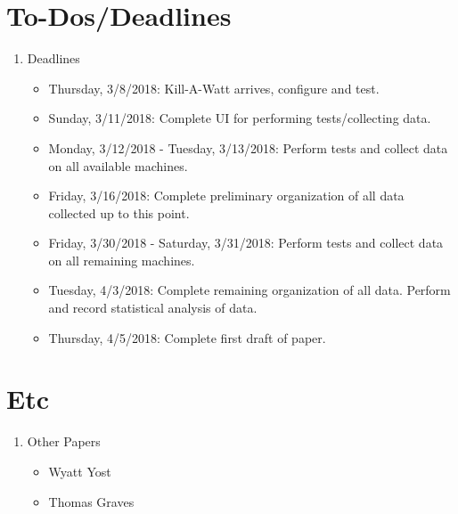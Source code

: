 \documentclass[11pt]{article}
\begin{document}
\section{To-Dos/Deadlines}

\begin{enumerate}
\item{Deadlines
	\begin{itemize}
	\item{Thursday, 3/8/2018: Kill-A-Watt arrives, configure and test.}
	\item{Sunday, 3/11/2018: Complete UI for performing tests/collecting data.}
	\item{Monday, 3/12/2018 - Tuesday, 3/13/2018: Perform tests and collect data on all available machines.}
	\item{Friday, 3/16/2018: Complete preliminary organization of all data collected up to this point.}
	\item{Friday, 3/30/2018 - Saturday, 3/31/2018: Perform tests and collect data on all remaining machines.}
	\item{Tuesday, 4/3/2018: Complete remaining organization of all data. Perform and record statistical analysis of data.}
	\item{Thursday, 4/5/2018: Complete first draft of paper. }
	\end{itemize}
	}
\end{enumerate}

\section{Etc}
\begin{enumerate}
\item{Other Papers
	\begin{itemize}
	\item{Wyatt Yost}
	\item{Thomas Graves}
	\end{itemize}
	}
\end{enumerate}
\end{document}
